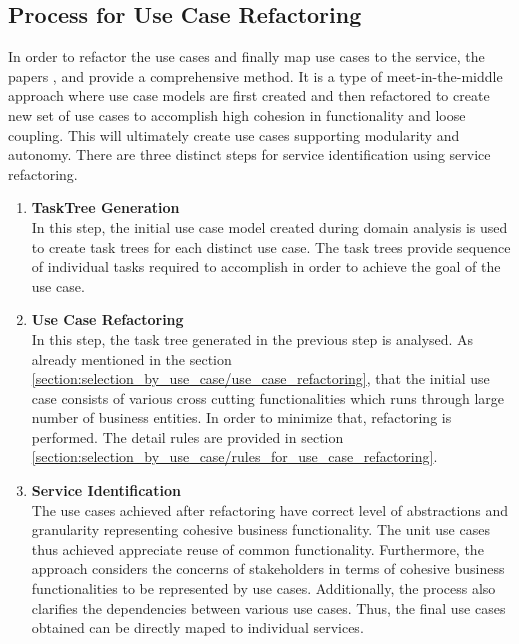 \subsection{Process for Use Case Refactoring}\label{section:selection_by_use_case/process_for_use_case_refactoring}
In order to refactor the use cases and finally map use cases to the service, the papers \cite{Kim:2006aa}, \cite{Yun:2006aa} and \cite{Doh:2007aa} provide a comprehensive method. It is a type of meet-in-the-middle approach where use case models are first created and then refactored to create new set of use cases to accomplish high cohesion in functionality and loose coupling. This will ultimately create use cases supporting modularity and autonomy. \cite{Fareghzadeh:2008aa} There are three distinct steps for service identification using service refactoring.
\begin{enumerate}
\item \textbf{TaskTree Generation}\\
In this step, the initial use case model created during domain analysis is used to create task trees for each distinct use case. The task trees provide sequence of individual tasks required to accomplish in order to achieve the goal of the use case.
\\
\item \textbf{Use Case Refactoring}\\
In this step, the task tree generated in the previous step is analysed. As already mentioned in the section \ref{section:selection_by_use_case/use_case_refactoring}, that the initial use case consists of various cross cutting functionalities which runs through large number of business entities. In order to minimize that, refactoring is performed. The detail rules are provided in section \ref{section:selection_by_use_case/rules_for_use_case_refactoring}.
\\
\item \textbf{Service Identification}\\
The use cases achieved after refactoring have correct level of abstractions and granularity representing cohesive business functionality. The unit use cases thus achieved appreciate reuse of common functionality.  \cite{Doh:2007aa} Furthermore, the approach considers the concerns of stakeholders in terms of cohesive business functionalities to be represented by use cases.\cite{Fareghzadeh:2008aa} Additionally, the process also clarifies the dependencies between various use cases. Thus, the final use cases obtained can be directly maped to individual services.
\end{enumerate}
\\

